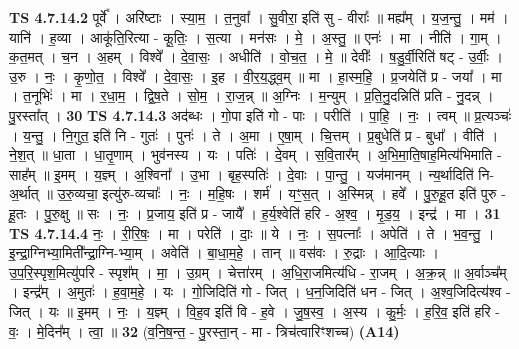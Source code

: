 \documentclass[17pt]{extarticle}
\begin{document}
                  \newline
                                \textbf{ TS 4.7.14.2} \newline
                  पूर्वे᳚ । अरि॑ष्टाः । स्या॒म॒ । त॒नुवा᳚ । सु॒वीरा॒ इति॑ सु - वीराः᳚ ॥ मह्य᳚म् । य॒ज॒न्तु॒ । मम॑ । यानि॑ । ह॒व्या । आकू॑ति॒रित्या - कू॒तिः॒ । स॒त्या । मन॑सः । मे॒ । अ॒स्तु॒ ॥ एनः॑ । मा । नीति॑ । गा॒म् । क॒त॒मत् । च॒न । अ॒हम् । विश्वे᳚ । दे॒वा॒सः॒ । अधीति॑ । वो॒च॒त॒ । मे॒ ॥ देवीः᳚ । ष॒डु॒र्वी॒रिति॑ षट् - उ॒र्वीः॒ । उ॒रु । नः॒ । कृ॒णो॒त॒ । विश्वे᳚ । दे॒वा॒सः॒ । इ॒ह । वी॒र॒य॒द्ध्व॒म् ॥ मा । हा॒स्म॒हि॒ । प्र॒जयेति॑ प्र - जया᳚ । मा । त॒नूभिः॑ । मा । र॒धा॒म॒ । द्वि॒ष॒ते । सो॒म॒ । रा॒ज॒न्न् ॥ अ॒ग्निः । म॒न्युम् । प्र॒ति॒नु॒दन्निति॑ प्रति - नु॒दन्न् । पु॒रस्ता᳚त् । \textbf{  30} \newline
                  \newline
                                \textbf{ TS 4.7.14.3} \newline
                  अद॑ब्धः । गो॒पा इति॑ गो - पाः । परीति॑ । पा॒हि॒ । नः॒ । त्वम् ॥ प्र॒त्यञ्चः॑ । य॒न्तु॒ । नि॒गुत॒ इति॑ नि - गुतः॑ । पुनः॑ । ते । अ॒मा । ए॒षा॒म् । चि॒त्तम् । प्र॒बुधेति॑ प्र - बुधा᳚ । वीति॑ । ने॒श॒त् ॥ धा॒ता । धा॒तृ॒णाम् । भुव॑नस्य । यः । पतिः॑ । दे॒वम् । स॒वि॒तार᳚म् । अ॒भि॒मा॒ति॒षाह॒मित्य॑भिमाति - साह᳚म् ॥ इ॒मम् । य॒ज्ञ्म् । अ॒श्विना᳚ । उ॒भा । बृह॒स्पतिः॑ । दे॒वाः । पा॒न्तु॒ । यज॑मानम् । न्य॒र्थादिति॑ नि- अ॒र्थात् ॥ उ॒रु॒व्यचा॒ इत्यु॑रु-व्यचाः᳚ । नः॒ । म॒हि॒षः । शर्म॑ । यꣳ॒॒स॒त् । अ॒स्मिन्न् । हवे᳚ । पु॒रु॒हू॒त इति॑ पुरु - हू॒तः । पु॒रु॒क्षु ॥ सः । नः॒ । प्र॒जाय॒ इति॑ प्र - जायै᳚ । ह॒र्य॒श्वेति॑ हरि - अ॒श्व॒ । मृ॒ड॒य॒ । इन्द्र॑ । मा । \textbf{  31} \newline
                  \newline
                                \textbf{ TS 4.7.14.4} \newline
                  नः॒ । री॒रि॒षः॒ । मा । परेति॑ । दाः॒ ॥ ये । नः॒ । स॒पत्नाः᳚ । अपेति॑ । ते । भ॒व॒न्तु॒ । इ॒न्द्रा॒ग्निभ्या॒मिती᳚न्द्रा॒ग्नि-भ्या॒म् । अवेति॑ । बा॒धा॒म॒हे॒ । तान् ॥ वस॑वः । रु॒द्राः । आ॒दि॒त्याः । उ॒प॒रि॒स्पृश॒मित्यु॑परि - स्पृश᳚म् । मा॒ । उ॒ग्रम् । चेत्ता॑रम् । अ॒धि॒रा॒जमित्य॑धि - रा॒जम् । अ॒क्र॒न्न् ॥ अ॒र्वाञ्च᳚म् । इन्द्र᳚म् । अ॒मुतः॑ । ह॒वा॒म॒हे॒ । यः । गो॒जिदिति॑ गो - जित् । ध॒न॒जिदिति॑ धन - जित् । अ॒श्व॒जिदित्य॑श्व - जित् । यः ॥ इ॒मम् । नः॒ । य॒ज्ञ्म् । वि॒ह॒व इति॑ वि - ह॒वे । जु॒ष॒स्व॒ । अ॒स्य । कु॒र्मः॒ । ह॒रि॒व॒ इति॑ हरि - वः॒ । मे॒दिन᳚म् । त्वा॒ ॥ \textbf{  32 } \newline
                  \newline
                      (व॒नि॒ष॒न्त॒ - पु॒रस्ता॒न् - मा - त्रिच॑त्वारिꣳशच्च)  \textbf{(A14)} \newline \newline
\end{document}
